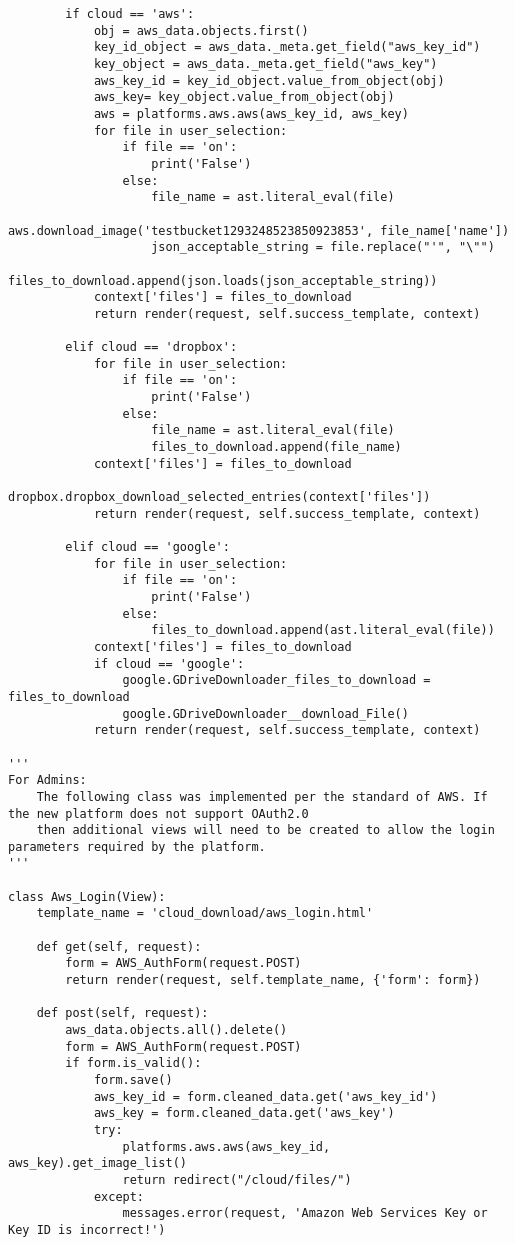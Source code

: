 \documentclass{article}
\begin{document}
\begin{verbatim}
        if cloud == 'aws':
            obj = aws_data.objects.first()
            key_id_object = aws_data._meta.get_field("aws_key_id")
            key_object = aws_data._meta.get_field("aws_key")
            aws_key_id = key_id_object.value_from_object(obj)
            aws_key= key_object.value_from_object(obj)
            aws = platforms.aws.aws(aws_key_id, aws_key)
            for file in user_selection:
                if file == 'on':
                    print('False')
                else:
                    file_name = ast.literal_eval(file)
                    aws.download_image('testbucket1293248523850923853', file_name['name'])
                    json_acceptable_string = file.replace("'", "\"")
                    files_to_download.append(json.loads(json_acceptable_string))
            context['files'] = files_to_download
            return render(request, self.success_template, context)

        elif cloud == 'dropbox':
            for file in user_selection:
                if file == 'on':
                    print('False')
                else:
                    file_name = ast.literal_eval(file)
                    files_to_download.append(file_name)
            context['files'] = files_to_download
            dropbox.dropbox_download_selected_entries(context['files'])
            return render(request, self.success_template, context)

        elif cloud == 'google':
            for file in user_selection:
                if file == 'on':
                    print('False')
                else:
                    files_to_download.append(ast.literal_eval(file))
            context['files'] = files_to_download
            if cloud == 'google':
                google.GDriveDownloader_files_to_download = files_to_download
                google.GDriveDownloader__download_File()
            return render(request, self.success_template, context)

'''
For Admins:
    The following class was implemented per the standard of AWS. If the new platform does not support OAuth2.0
    then additional views will need to be created to allow the login parameters required by the platform.
'''

class Aws_Login(View):
    template_name = 'cloud_download/aws_login.html'

    def get(self, request):
        form = AWS_AuthForm(request.POST)
        return render(request, self.template_name, {'form': form})
        
    def post(self, request):
        aws_data.objects.all().delete()
        form = AWS_AuthForm(request.POST)
        if form.is_valid():
            form.save()
            aws_key_id = form.cleaned_data.get('aws_key_id')
            aws_key = form.cleaned_data.get('aws_key')
            try:
                platforms.aws.aws(aws_key_id, aws_key).get_image_list()
                return redirect("/cloud/files/")   
            except:
                messages.error(request, 'Amazon Web Services Key or Key ID is incorrect!')                 


\end{verbatim}
\end{document}
